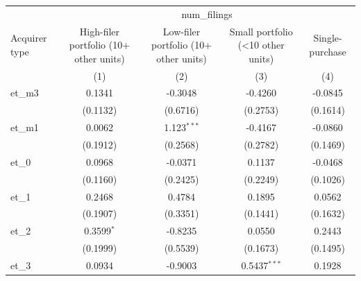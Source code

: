 
\begingroup
\centering
\begin{tabular}{lcccc}
   \toprule
    & \multicolumn{4}{c}{num\_filings}\\
   Acquirer type       & High-filer portfolio (10+ other units) & Low-filer portfolio (10+ other units) & Small portfolio (<10 other units) & Single-purchase \\   
                       & (1)                                    & (2)                                   & (3)                               & (4)\\  
   \midrule 
   et\_m3              & 0.1341                                 & -0.3048                               & -0.4260                           & -0.0845\\   
                       & (0.1132)                               & (0.6716)                              & (0.2753)                          & (0.1614)\\   
   et\_m1              & 0.0062                                 & 1.123$^{***}$                         & -0.4167                           & -0.0860\\   
                       & (0.1912)                               & (0.2568)                              & (0.2782)                          & (0.1469)\\   
   et\_0               & 0.0968                                 & -0.0371                               & 0.1137                            & -0.0468\\   
                       & (0.1160)                               & (0.2425)                              & (0.2249)                          & (0.1026)\\   
   et\_1               & 0.2468                                 & 0.4784                                & 0.1895                            & 0.0562\\   
                       & (0.1907)                               & (0.3351)                              & (0.1441)                          & (0.1632)\\   
   et\_2               & 0.3599$^{*}$                           & -0.8235                               & 0.0550                            & 0.2443\\   
                       & (0.1999)                               & (0.5539)                              & (0.1673)                          & (0.1495)\\   
   et\_3               & 0.0934                                 & -0.9003                               & 0.5437$^{***}$                    & 0.1928\\   

\end{tabular}
